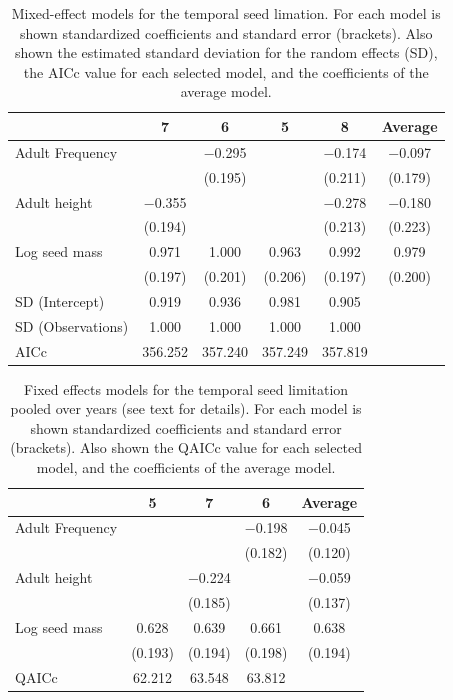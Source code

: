 \documentclass{article}
\begin{document}
%
\begin{table}
\caption{Mixed-effect models for the temporal seed limation. For each
  model is shown standardized coefficients and standard error
  (brackets). Also shown the estimated standard deviation for the
  random effects (SD), the AICc value for each selected model, and the
  coefficients of the average model.}
\centering
\begin{tabular}[t]{lccccc}
\toprule
  & 7 & 6 & 5 & 8 & Average\\
\midrule
Adult Frequency &  & \num{-0.295} &  & \num{-0.174} & \num{-0.097}\\
 &  & (\num{0.195}) &  & (\num{0.211}) & (\num{0.179})\\
Adult height & \num{-0.355} &  &  & \num{-0.278} & \num{-0.180}\\
 & (\num{0.194}) &  &  & (\num{0.213}) & (\num{0.223})\\
Log seed mass & \num{0.971} & \num{1.000} & \num{0.963} & \num{0.992} & \num{0.979}\\
 & (\num{0.197}) & (\num{0.201}) & (\num{0.206}) & (\num{0.197}) & (\num{0.200})\\
SD (Intercept) & \num{0.919} & \num{0.936} & \num{0.981} & \num{0.905} & \\
SD (Observations) & \num{1.000} & \num{1.000} & \num{1.000} & \num{1.000} & \\
\midrule
AICc & \num{356.252} & \num{357.240} & \num{357.249} & \num{357.819} & \\
\bottomrule
\end{tabular}
\label{tab:SSL_glm}
\end{table}


%
\begin{table}
\caption{Fixed effects models for the temporal seed limitation pooled
  over years (see text for details). For each model is shown
  standardized coefficients and standard error (brackets). Also shown
  the QAICc value for each selected model, and the coefficients of the
  average model.}
\centering
\begin{tabular}[t]{lcccc}
\toprule
  & 5 & 7 & 6 & Average\\
\midrule
Adult Frequency &  &  & \num{-0.198} & \num{-0.045}\\
 &  &  & (\num{0.182}) & (\num{0.120})\\
Adult height &  & \num{-0.224} &  & \num{-0.059}\\
 &  & (\num{0.185}) &  & (\num{0.137})\\
Log seed mass & \num{0.628} & \num{0.639} & \num{0.661} & \num{0.638}\\
 & (\num{0.193}) & (\num{0.194}) & (\num{0.198}) & (\num{0.194})\\
\midrule
QAICc & \num{62.212} & \num{63.548} & \num{63.812} & \\
\bottomrule
\end{tabular}
\label{tab:TSL_glm}
\end{table}
\end{document}
